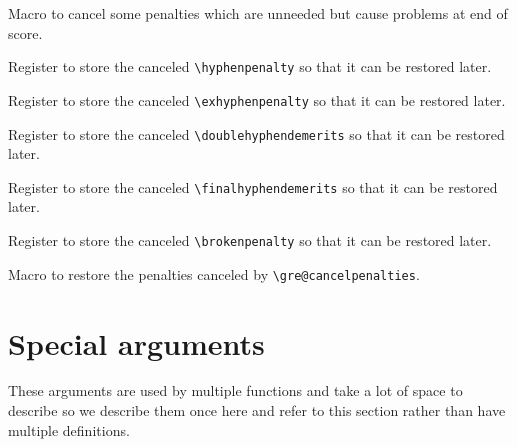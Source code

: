 Macro to cancel some penalties which are unneeded but cause problems at end of score.

Register to store the canceled \verb=\hyphenpenalty= so that it can be restored later.

Register to store the canceled \verb=\exhyphenpenalty= so that it can be restored later.

Register to store the canceled \verb=\doublehyphendemerits= so that it can be restored later.

Register to store the canceled \verb=\finalhyphendemerits= so that it can be restored later.

Register to store the canceled \verb=\brokenpenalty= so that it can be restored later.

Macro to restore the penalties canceled by \verb=\gre@cancelpenalties=.



\section{Special arguments}

These arguments are used by multiple functions and take a lot of space
to describe so we describe them once here and refer to this section
rather than have multiple definitions.

